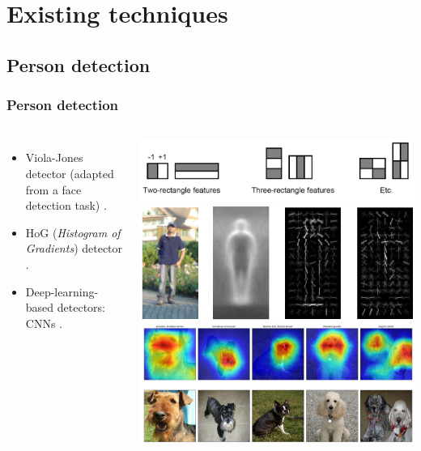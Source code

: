 \documentclass[11pt]{beamer}
\begin{document}
\section{Existing techniques}

\subsection{Person detection}
\begin{frame}
	\frametitle{Person detection}
		\begin{columns}
		\vspace{-0.2cm}
		\begin{itemize}
			\item Viola-Jones detector (adapted from a face detection task) \cite{violajones}.
			\vspace{0.3cm}
			\item HoG (\textit{Histogram of Gradients}) detector \cite{hog_detection}.
			\vspace{0.7cm}
			\item Deep-learning-based detectors: CNNs \cite{alexnet}.
		\end{itemize}
		
		\begin{center}
		\includegraphics[width=0.9\linewidth]{haar_feats} \\
		\vspace{0.5cm}
		\includegraphics[width=0.7\linewidth]{hog} \\
		\vspace{0.4cm}
		\includegraphics[width=0.9\linewidth]{activation_maps} \\
		\end{center}
	\end{columns}
\end{frame}
\end{document}
